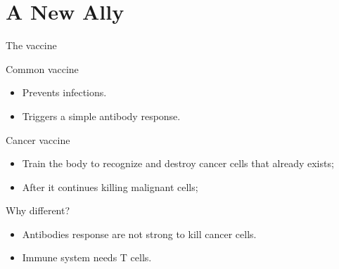 \documentclass[dvips,11pt,xcolor=dvipsnames]{beamer}
\numberwithin{table}{section}
\numberwithin{figure}{section} %
\begin{document}
\section{A New Ally}

\begin{frame}{The vaccine}
 \begin{block}{Common vaccine}
    \begin{itemize}
    \item Prevents infections.
      \item Triggers a simple antibody response.
    \end{itemize}
  \end{block}

\pause  \begin{block}{Cancer vaccine}
    \begin{itemize}
    \item  Train the body  to recognize  and destroy  cancer cells  that already
      exists;
    \item After it continues killing malignant cells;
    \end{itemize}
  \end{block}

\pause \begin{alertblock}{Why different?}
    \begin{itemize}
    \item Antibodies response are not strong to kill cancer cells.
    \item Immune system needs T cells.
    \end{itemize}
  \end{alertblock}
\end{frame}
\end{document}
